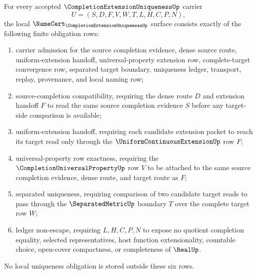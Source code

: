 \begin{theorem}
\label{thm:completion-extension-uniqueness-namecert-obligations}
For every accepted $\CompletionExtensionUniquenessUp$ carrier
$$
U=(S,D,F,V,W,T,L,H,C,P,N),
$$
the local $\NameCert_{\CompletionExtensionUniquenessUp}$ surface consists exactly of the following finite obligation rows:
\begin{enumerate}
\item carrier admission for the source completion evidence, dense source route, uniform-extension handoff, universal-property extension row, complete-target convergence row, separated target boundary, uniqueness ledger, transport, replay, provenance, and local naming row;
\item source-completion compatibility, requiring the dense route $D$ and extension handoff $F$ to read the same source completion evidence $S$ before any target-side comparison is available;
\item uniform-extension handoff, requiring each candidate extension packet to reach its target read only through the $\UniformContinuousExtensionUp$ row $F$;
\item universal-property row exactness, requiring the $\CompletionUniversalPropertyUp$ row $V$ to be attached to the same source completion evidence, dense route, and target route as $F$;
\item separated uniqueness, requiring comparison of two candidate target reads to pass through the $\SeparatedMetricUp$ boundary $T$ over the complete target row $W$;
\item ledger non-escape, requiring $L,H,C,P,N$ to expose no quotient completion equality, selected representatives, host function extensionality, countable choice, open-cover compactness, or completeness of $\RealUp$.
\end{enumerate}
No local uniqueness obligation is stored outside these six rows.
\end{theorem}
